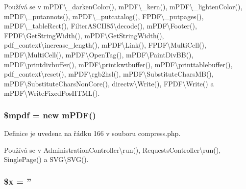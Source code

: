 Používá se v m\-P\-D\-F\textbackslash{}\-\_\-darken\-Color(), m\-P\-D\-F\textbackslash{}\-\_\-kern(), m\-P\-D\-F\textbackslash{}\-\_\-lighten\-Color(), m\-P\-D\-F\textbackslash{}\-\_\-putannots(), m\-P\-D\-F\textbackslash{}\-\_\-putcatalog(), F\-P\-D\-F\textbackslash{}\-\_\-putpages(), m\-P\-D\-F\textbackslash{}\-\_\-table\-Rect(), Filter\-A\-S\-C\-I\-I85\textbackslash{}decode(), m\-P\-D\-F\textbackslash{}\-Footer(), F\-P\-D\-F\textbackslash{}\-Get\-String\-Width(), m\-P\-D\-F\textbackslash{}\-Get\-String\-Width(), pdf\-\_\-context\textbackslash{}increase\-\_\-length(), m\-P\-D\-F\textbackslash{}\-Link(), F\-P\-D\-F\textbackslash{}\-Multi\-Cell(), m\-P\-D\-F\textbackslash{}\-Multi\-Cell(), m\-P\-D\-F\textbackslash{}\-Open\-Tag(), m\-P\-D\-F\textbackslash{}\-Paint\-Div\-B\-B(), m\-P\-D\-F\textbackslash{}printdivbuffer(), m\-P\-D\-F\textbackslash{}printkwtbuffer(), m\-P\-D\-F\textbackslash{}printtablebuffer(), pdf\-\_\-context\textbackslash{}reset(), m\-P\-D\-F\textbackslash{}rgb2hsl(), m\-P\-D\-F\textbackslash{}\-Substitute\-Chars\-M\-B(), m\-P\-D\-F\textbackslash{}\-Substitute\-Chars\-Non\-Core(), directw\textbackslash{}\-Write(), F\-P\-D\-F\textbackslash{}\-Write() a m\-P\-D\-F\textbackslash{}\-Write\-Fixed\-Pos\-H\-T\-M\-L().

\hypertarget{compress_8php_ad028f81910d6cbab9b184d2214b3a8f8}{
\subsubsection[{\$mpdf}]{\setlength{\rightskip}{0pt plus 5cm}\$mpdf = new {\bf m\-P\-D\-F}()}}\label{compress_8php_ad028f81910d6cbab9b184d2214b3a8f8}


Definice je uvedena na řádku 166 v souboru compress.\-php.



Používá se v Administration\-Controller\textbackslash{}run(), Requests\-Controller\textbackslash{}run(), Single\-Page() a S\-V\-G\textbackslash{}\-S\-V\-G().

\hypertarget{compress_8php_af3a16c5f0dd7a74cf9acf6a49fff73a7}{
\subsubsection[{\$x}]{\setlength{\rightskip}{0pt plus 5cm}\$x = ''}}\label{compress_8php_af3a16c5f0dd7a74cf9acf6a49fff73a7}


